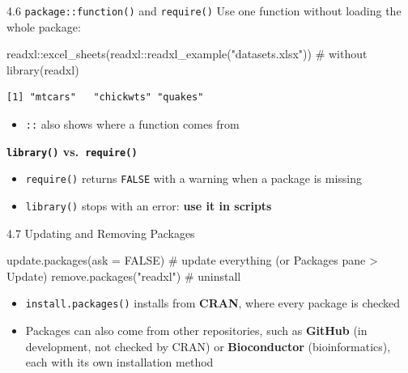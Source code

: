 \documentclass[
  ignorenonframetext,
  aspectratio=169,
]{beamer}
\newenvironment{Shaded}{\begin{snugshade}}{\end{snugshade}}
\newcommand{\AttributeTok}[1]{\textcolor[rgb]{0.40,0.45,0.13}{#1}}
\newcommand{\CommentTok}[1]{\textcolor[rgb]{0.37,0.37,0.37}{#1}}
\newcommand{\ConstantTok}[1]{\textcolor[rgb]{0.56,0.35,0.01}{#1}}
\newcommand{\FunctionTok}[1]{\textcolor[rgb]{0.28,0.35,0.67}{#1}}
\newcommand{\NormalTok}[1]{\textcolor[rgb]{0.00,0.23,0.31}{#1}}
\newcommand{\SpecialCharTok}[1]{\textcolor[rgb]{0.37,0.37,0.37}{#1}}
\newcommand{\StringTok}[1]{\textcolor[rgb]{0.13,0.47,0.30}{#1}}
\providecommand{\tightlist}{%
  \setlength{\itemsep}{0pt}\setlength{\parskip}{0pt}}
\begin{document}
\begin{frame}[fragile]{4.6 \texttt{package::function()} and
\texttt{require()}}
\protect{}\label{packagefunction-and-require}
Use one function without loading the whole package:

\begin{Shaded}
\begin{Highlighting}[]
\NormalTok{readxl}\SpecialCharTok{::}\FunctionTok{excel\_sheets}\NormalTok{(readxl}\SpecialCharTok{::}\FunctionTok{readxl\_example}\NormalTok{(}\StringTok{"datasets.xlsx"}\NormalTok{))   }\CommentTok{\# without library(readxl)}
\end{Highlighting}
\end{Shaded}

\begingroup\tiny\color{darkgray}

\begin{verbatim}
[1] "mtcars"   "chickwts" "quakes"  
\end{verbatim}

\endgroup

\begin{itemize}
\tightlist
\item
  \texttt{::} also shows where a function comes from
\end{itemize}

\textbf{\texttt{library()} vs.~\texttt{require()}}

\begin{itemize}
\tightlist
\item
  \texttt{require()} returns \texttt{FALSE} with a warning when a
  package is missing
\item
  \texttt{library()} stops with an error: \textbf{use it in scripts}
\end{itemize}
\end{frame}

\begin{frame}[fragile]{4.7 Updating and Removing Packages}
\protect{}\label{updating-and-removing-packages}
\begin{Shaded}
\begin{Highlighting}[]
\FunctionTok{update.packages}\NormalTok{(}\AttributeTok{ask =} \ConstantTok{FALSE}\NormalTok{)   }\CommentTok{\# update everything (or Packages pane \textgreater{} Update)}
\FunctionTok{remove.packages}\NormalTok{(}\StringTok{"readxl"}\NormalTok{)      }\CommentTok{\# uninstall}
\end{Highlighting}
\end{Shaded}

\begin{itemize}
\tightlist
\item
  \texttt{install.packages()} installs from \textbf{CRAN}, where every
  package is checked
\item
  Packages can also come from other repositories, such as
  \textbf{GitHub} (in development, not checked by CRAN) or
  \textbf{Bioconductor} (bioinformatics), each with its own installation
  method
\end{itemize}
\end{frame}
\end{document}
